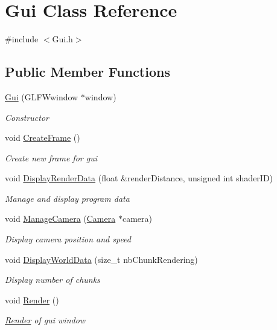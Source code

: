\hypertarget{class_gui}{}\section{Gui Class Reference}
\label{class_gui}


{\ttfamily \#include $<$Gui.\+h$>$}

\subsection*{Public Member Functions}
\begin{DoxyCompactItemize}
\item 
\mbox{\hyperlink{class_gui_abd0b1cbb88cee15fb7f1ef3ae5fd8fad}{Gui}} (G\+L\+F\+Wwindow $\ast$window)
\begin{DoxyCompactList}\small\item\em Constructor \end{DoxyCompactList}\item 
void \mbox{\hyperlink{class_gui_a4adb127cac9b23b712d30bed6e127421}{Create\+Frame}} ()
\begin{DoxyCompactList}\small\item\em Create new frame for gui \end{DoxyCompactList}\item 
void \mbox{\hyperlink{class_gui_ab8755893515e2f7354e88359a3ac90be}{Display\+Render\+Data}} (float \&render\+Distance, unsigned int shader\+ID)
\begin{DoxyCompactList}\small\item\em Manage and display program data \end{DoxyCompactList}\item 
void \mbox{\hyperlink{class_gui_ac8c1da0d97fd585190830538a6ea432c}{Manage\+Camera}} (\mbox{\hyperlink{class_camera}{Camera}} $\ast$camera)
\begin{DoxyCompactList}\small\item\em Display camera position and speed \end{DoxyCompactList}\item 
void \mbox{\hyperlink{class_gui_a31585d980883836e9139018d348508c7}{Display\+World\+Data}} (size\+\_\+t nb\+Chunk\+Rendering)
\begin{DoxyCompactList}\small\item\em Display number of chunks \end{DoxyCompactList}\item 
void \mbox{\hyperlink{class_gui_ae0afe0b27557be9d9e747e7fa1b3cd86}{Render}} ()
\begin{DoxyCompactList}\small\item\em \mbox{\hyperlink{class_render}{Render}} of gui window \end{DoxyCompactList}\end{DoxyCompactItemize}


